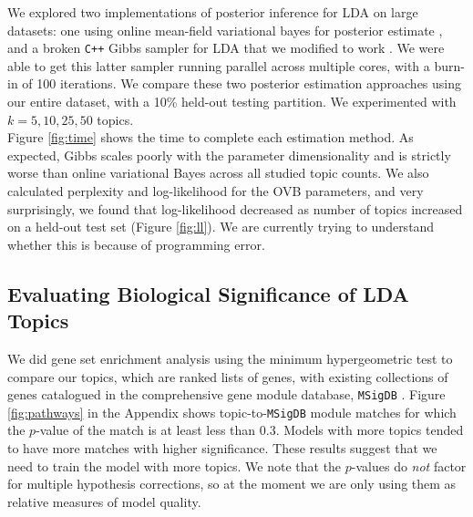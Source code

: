\documentclass[11pt]{article}
\begin{document}
We explored two implementations of posterior inference for LDA on large datasets: one using online mean-field variational bayes for posterior estimate \cite{ovb, online}, and a broken \texttt{C++} Gibbs sampler for LDA that we modified to work \cite{plda}. We were able to get this latter sampler running parallel across multiple cores, with a burn-in of 100 iterations. We compare these two posterior estimation approaches using our entire dataset, with a 10\% held-out testing partition. We experimented with
$k=5, 10, 25, 50$ topics. \\

Figure \ref{fig:time} shows the time to complete each estimation method. As expected, Gibbs scales poorly with the parameter dimensionality and is strictly worse than online variational Bayes across all studied topic counts. We also calculated perplexity and log-likelihood for the OVB parameters, and very surprisingly, we found that log-likelihood decreased as number of topics increased on a held-out test set (Figure \ref{fig:ll}). We are currently trying to understand whether this is because of programming error.

\subsection*{Evaluating Biological Significance of LDA Topics}

We did gene set enrichment analysis using the minimum hypergeometric test \cite{hg} to compare our topics, which are ranked lists of genes, with existing collections of genes catalogued in the comprehensive gene module database, \texttt{MSigDB} \cite{msigdb}. Figure \ref{fig:pathways} in the Appendix shows topic-to-\texttt{MSigDB} module matches for which the $p$-value of the match is at least less than 0.3. Models with more topics tended to have more matches with higher significance. These results suggest that we need to train the model with more topics. We note that the $p$-values do \textit{not} factor for multiple hypothesis corrections, so at the moment we are only using them as relative measures of model quality.
\end{document}
